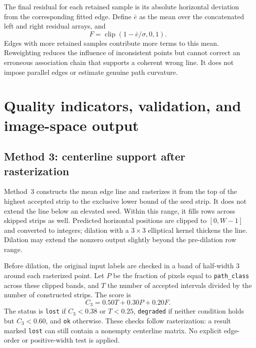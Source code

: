 The final residual for each retained sample is its absolute horizontal
deviation from the corresponding fitted edge. Define $\bar e$ as the
mean over the concatenated left and right residual arrays, and
\begin{equation}
    F=\operatorname{clip}(1-\bar e/\sigma,0,1).
    \label{eq:c4_fit_score}
\end{equation}
Edges with more retained samples contribute more terms to this mean.
Reweighting reduces the influence of inconsistent points but cannot
correct an erroneous association chain that supports a coherent wrong
line. It does not impose parallel edges or estimate genuine path curvature.

\section{Quality indicators, validation, and image-space output}
\label{sec:c4_output}

\subsection{Method 3: centerline support after rasterization}
\label{subsec:c4_output3}

Method~3 constructs the mean edge line and rasterizes it from the top
of the highest accepted strip to the exclusive lower bound of the seed
strip. It does not extend the line below an elevated seed. Within this
range, it fills rows across skipped strips as well. Predicted horizontal
positions are clipped to $[0,W-1]$ and converted to integers; dilation
with a $3\times3$ elliptical kernel thickens the line. Dilation may extend
the nonzero output slightly beyond the pre-dilation row range.

Before dilation, the original input labels are checked in a band of
half-width 3 around each rasterized point. Let $P$ be the fraction of
pixels equal to \texttt{path\_class} across these clipped bands, and
$T$ the number of accepted intervals divided by the number of constructed
strips. The score is
\begin{equation}
    C_3=0.50T+0.30P+0.20F.
    \label{eq:c4_confidence3}
\end{equation}
The status is \texttt{lost} if $C_3<0.38$ or $T<0.25$,
\texttt{degraded} if neither condition holds but $C_3<0.60$, and
\texttt{ok} otherwise. These checks follow rasterization: a result marked
\texttt{lost} can still contain a nonempty centerline matrix. No explicit
edge-order or positive-width test is applied.

